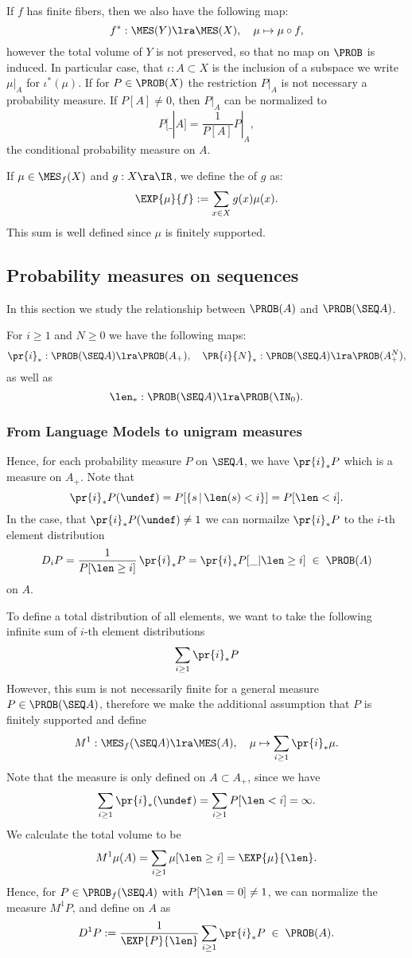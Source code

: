 \documentclass[11pt]{article}
\begin{document}
If $f$ has finite fibers, then we also have the following map:
\[ f^*: \MES(Y) \lra \MES(X), \quad \mu \mapsto \mu \circ f, \]
however the total volume of $Y$ is not preserved, so that no map on
$\PROB$ is induced. In particular case, that $\iota: A \subset X$ is
the inclusion of a subspace we write $\mu|_A$ for $\iota^*(\mu)$.  If
for $P\in \PROB(X)$ the restriction $P|_{A}$ is not necessary a
probability measure. If $P[A] \neq 0$, then $P|_A$ can be normalized
to \[ P[\_|A]=\frac{1}{P[A]}P|_A,\] the conditional probability
measure on $A$.

If $\mu \in \MES_f(X)$ and $g:X \ra \IR$, we define the 
of $g$ as:
\[ \EXP{\mu}{f} :=  \sum_{x \in X} g(x) \mu(x). \]
This sum is well defined since $\mu$ is  finitely supported.

\subsection{Probability measures on sequences}

In this section we study the relationship between $\PROB(A)$ and
$\PROB(\SEQ A)$.

For $i \geq 1$ and $N \geq 0$ we have the following maps:
\[ \pr{i}_*: \PROB(\SEQ A) \lra \PROB(A_+), \quad \PR{i}{N}_*: \PROB(\SEQ A) \lra \PROB(A^N_+), \]
as well as
\[ \len_*: \PROB(\SEQ A) \lra \PROB(\IN_0). \]

\subsubsection{From Language Models to unigram measures}

Hence, for each probability measure $P$ on $\SEQ A$, we have
$\pr{i}_* P$ which is a measure on $A_+$. Note that
\[ \pr{i}_* P (\undef) = P[\{s \,|\, \len(s) < i \}] = P[\len < i]. \]
In the case, that $\pr{i}_* P (\undef) \neq 1$ we can normailze
$\pr{i}_* P$ to the $i$-th element distribution
\[ D_i P = \frac{1}{P[\len \geq i]} \, \pr{i}_* P = \pr{i}_*P[\_|\len
\geq i]  \;\in\; \PROB(A)\]
on $A$.

To define a total distribution of all elements, we want to take the
following infinite sum of $i$-th element distributions
\[ \sum_{i \geq 1} \pr{i}_* P \]
However, this sum is not necessarily finite for a general measure $P
\in \PROB(\SEQ A)$, therefore we make the additional assumption that $P$
is finitely supported and define
\[ M^1 : \MES_f(\SEQ A) \lra \MES(A), \quad \mu \mapsto 
         \sum_{i \geq 1} \pr{i}_* \mu. \]
Note that the measure is only defined on $A \subset A_+$, since
we have
\[ \sum_{i \geq 1} \pr{i}_*(\undef) = \sum_{i \geq 1} P[\len < i] =
\infty. \]
We calculate the total volume to be
\[ M^1 \mu(A) = \sum_{i \geq 1} \mu[\len \geq i] = \EXP{\mu}{\len}. \]
Hence, for $P \in \PROB_f(\SEQ A)$ with $P[\len = 0] \neq 1$, we can
normalize the measure $M^1P$, and define  on
$A$ as
\[ D^1 P := \frac{1}{\EXP{P}{\len}} \sum_{i \geq 1} \pr{i}_* P \;\in\;
\PROB(A). \]
\end{document}

